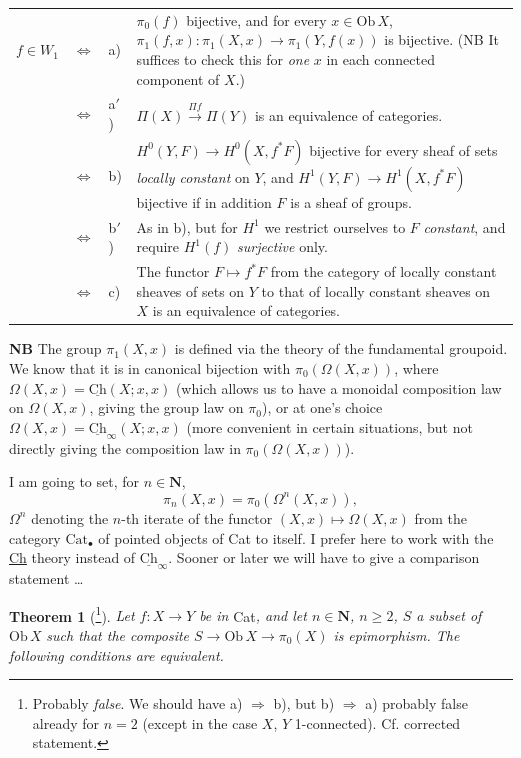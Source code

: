 \documentclass[11pt]{article}
\newcommand{\printedpage}[1]{\marginpar{\footnotesize p.~#1}}
\newcommand{\msp}[1]{\marginpar{\footnotesize [#1]}}
\newcommand{\Ch}{\underline{\mathrm{Ch}}}
\newcommand{\Ob}{\mathrm{Ob}\,}
\begin{document}
\noindent\begin{tabular}{@{}l c l >{\RaggedRight\arraybackslash}p{}@{}}
$f \in W_1$ & $\Longleftrightarrow$ & a) & $\pi_0(f)$ bijective, and for every $x \in \Ob X$, $\pi_1(f,x) : \pi_1(X,x) \longrightarrow \pi_1(Y,f(x))$ is bijective. (NB It suffices to check this for \textit{one} $x$ in each connected component of $X$.)\\
 & $\Longleftrightarrow$ & a$'$) & $\Pi(X) \xrightarrow{\Pi f} \Pi(Y)$ is an equivalence of categories.\\
 & $\Longleftrightarrow$ & b) & $H^0(Y,F) \longrightarrow H^0(X,f^*F)$ bijective for every sheaf of sets \textit{locally constant} on $Y$, and $H^1(Y,F) \longrightarrow H^1(X,f^*F)$ bijective if in addition $F$ is a sheaf of groups.\\
 & $\Longleftrightarrow$ & b$'$) & As in b), but for $H^1$ we restrict ourselves to $F$ \textit{constant}, and require $H^1(f)$ \textit{surjective} only.\\
 & $\Longleftrightarrow$ & c) & The functor $F \longmapsto f^*F$ from the category of locally constant sheaves of sets on $Y$ to that of locally constant sheaves on $X$ is an equivalence of categories.
\end{tabular}

\clearpage

\printedpage{116}

\msp{page 172}

\textbf{NB} The group $\pi_1(X,x)$ is defined via the theory of the fundamental groupoid. We know that it is in canonical bijection with $\pi_0(\Omega(X,x))$, where $\Omega(X,x) = \Ch(X;x,x)$ (which allows us to have a monoidal composition law on $\Omega(X,x)$, giving the group law on $\pi_0$), or at one's choice $\Omega(X,x) = \Ch_\infty(X;x,x)$ (more convenient in certain situations, but not directly giving the composition law in $\pi_0(\Omega(X,x))$).

I am going to set, for $n \in \mathbf{N}$,
\[
\pi_n(X,x) = \pi_0(\Omega^n(X,x)),
\]
$\Omega^n$ denoting the $n$-th iterate of the functor $(X,x) \longmapsto \Omega(X,x)$ from the category $\mathrm{Cat}_\bullet$ of pointed objects of Cat to itself. I prefer here to work with the \underline{Ch} theory instead of $\Ch_\infty$. Sooner or later we will have to give a comparison statement \dots

\textbf{Theorem 1} (\footnote[112]{Probably \textit{false}. We should have a) $\Longrightarrow$ b), but b) $\Longrightarrow$ a) probably false already for $n = 2$ (except in the case $X$, $Y$ 1-connected). Cf. corrected statement.}). \textit{Let $f : X \longrightarrow Y$ be in} Cat\textit{, and let $n \in \mathbf{N}$, $n \geq 2$, $S$ a subset of} $\Ob X$ \textit{such that the composite $S \longrightarrow \Ob X \longrightarrow \pi_0(X)$ is} \textit{epimorphism. The following conditions are equivalent.}
\end{document}
